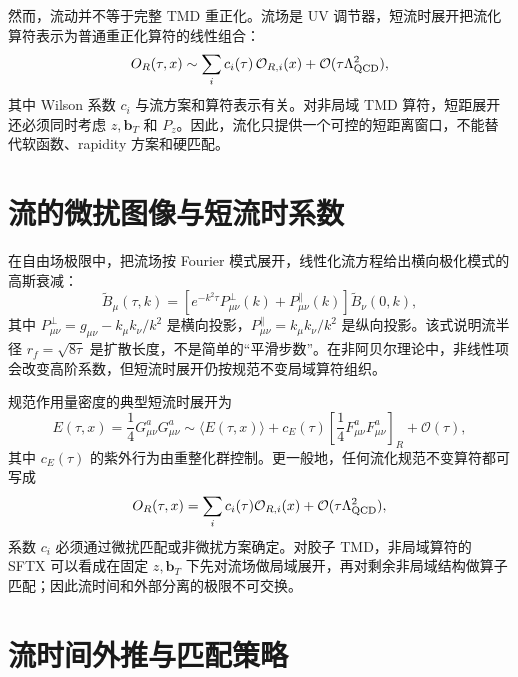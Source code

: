 \documentclass[UTF8,12pt,a4paper,twoside,openany]{ctexbook}
\newcommand{\bT}{\boldsymbol b_T}
\begin{document}
然而，流动并不等于完整 TMD 重正化。流场是 UV 调节器，短流时展开把流化算符表示为普通重正化算符的线性组合：
\begin{equation}
  O_R(\tau,x)
  \sim\sum_i c_i(\tau)\,\mathcal O_{R,i}(x)
  +\mathcal O(\tau\Lambda_{\rm QCD}^2),
  \label{eq:sftx}
\end{equation}
其中 Wilson 系数 \(c_i\) 与流方案和算符表示有关。对非局域 TMD 算符，短距展开还必须同时考虑 \(z,\bT\) 和 \(P_z\)。因此，流化只提供一个可控的短距离窗口，不能替代软函数、rapidity 方案和硬匹配。

\section{流的微扰图像与短流时系数}

在自由场极限中，把流场按 Fourier 模式展开，线性化流方程给出横向极化模式的高斯衰减：
\begin{equation}
  \widetilde B_\mu(\tau,k)
  =\left[e^{-k^2\tau}P^\perp_{\mu\nu}(k)
  +P^\parallel_{\mu\nu}(k)\right]\widetilde B_\nu(0,k),
  \label{eq:flowkernel}
\end{equation}
其中 \(P^\perp_{\mu\nu}=g_{\mu\nu}-k_\mu k_\nu/k^2\) 是横向投影，\(P^\parallel_{\mu\nu}=k_\mu k_\nu/k^2\) 是纵向投影。该式说明流半径 \(r_f=\sqrt{8\tau}\) 是扩散长度，不是简单的“平滑步数”。在非阿贝尔理论中，非线性项会改变高阶系数，但短流时展开仍按规范不变局域算符组织。

规范作用量密度的典型短流时展开为
\begin{equation}
  E(\tau,x)
  =\frac{1}{4}G^a_{\mu\nu}G^a_{\mu\nu}
  \sim \langle E(\tau,x)\rangle
  +c_E(\tau)\left[\frac{1}{4}F^a_{\mu\nu}F^a_{\mu\nu}\right]_R
  +\mathcal O(\tau),
  \label{eq:Esftx}
\end{equation}
其中 \(c_E(\tau)\) 的紫外行为由重整化群控制。更一般地，任何流化规范不变算符都可写成
\begin{equation}
  O_R(\tau,x)
  =\sum_i c_i(\tau)\mathcal O_{R,i}(x)
  +\mathcal O(\tau\Lambda_{\rm QCD}^2),
  \label{eq:genericsftx}
\end{equation}
系数 \(c_i\) 必须通过微扰匹配或非微扰方案确定。对胶子 TMD，非局域算符的 SFTX 可以看成在固定 \(z,\bT\) 下先对流场做局域展开，再对剩余非局域结构做算子匹配；因此流时间和外部分离的极限不可交换。

\section{流时间外推与匹配策略}
\end{document}
